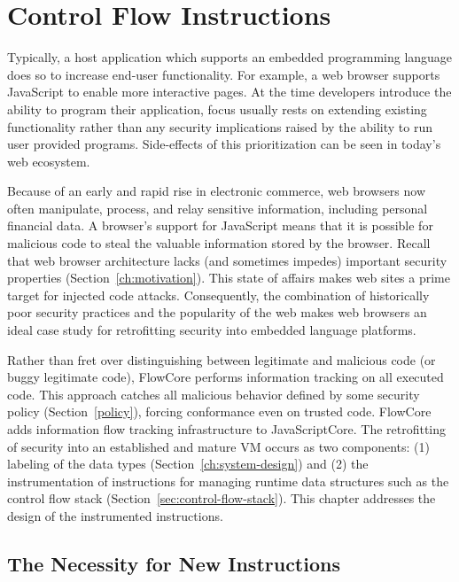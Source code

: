 
\newcommand{\popj}{\code{POPJ\_CFLABEL} }
\newcommand{\dup}{\code{DUP\_CFLABEL} }
\newcommand{\join}{\code{JOIN\_CFLABEL} }

\chapter{Control Flow Instructions}
\label{ch:instructions}

Typically, a host application which supports an embedded programming language does so to increase end-user functionality. 
For example, a web browser supports JavaScript to enable more interactive pages.
At the time developers introduce the ability to program their application, focus usually rests on extending existing functionality rather than any security implications raised by the ability to run user provided programs.
Side-effects of this prioritization can be seen in today's web ecosystem.

Because of an early and rapid rise in electronic commerce, web browsers now often manipulate, process, and relay sensitive information, including personal financial data.
A browser's support for JavaScript means that it is possible for malicious code to steal the valuable information stored by the browser.
Recall that web browser architecture lacks (and sometimes impedes) important security properties (Section~\ref{ch:motivation}).
This state of affairs makes web sites a prime target for injected code attacks.
Consequently, the combination of historically poor security practices and the popularity of the web makes web browsers an ideal case study for retrofitting security into embedded language platforms.

Rather than fret over distinguishing between legitimate and malicious code (or buggy legitimate code), FlowCore performs information tracking on all executed code.
This approach catches all malicious behavior defined by some security policy (Section~\ref{policy}), forcing conformance even on trusted code.
FlowCore adds information flow tracking infrastructure to JavaScriptCore.
The retrofitting of security into an established and mature VM occurs as two components:
(1) labeling of the data types (Section~\ref{ch:system-design}) and 
(2) the instrumentation of instructions for managing runtime data structures such as the control flow stack (Section~\ref{sec:control-flow-stack}).
This chapter addresses the design of the instrumented instructions.

\section{The Necessity for New Instructions}

